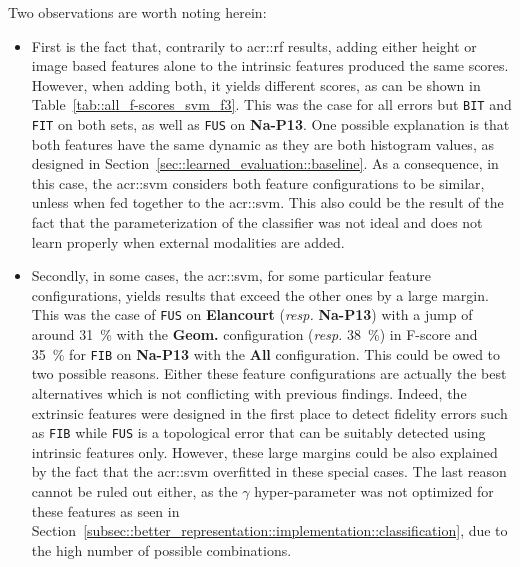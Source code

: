         Two observations are worth noting herein:
        \begin{itemize}[label=\(\blacktriangleright\)]
            \item First is the fact that, contrarily to \gls{acr::rf} results, adding either height or image based features alone to the intrinsic features produced the same scores.
                    However, when adding both, it yields different scores, as can be shown in Table~\ref{tab::all_f-scores_svm_f3}.
                    This was the case for all errors but \texttt{BIT} and \texttt{FIT} on both sets, as well as \texttt{FUS} on \textbf{Na-P13}.
                    One possible explanation is that both features have the same dynamic as they are both histogram values, as designed in Section~\ref{sec::learned_evaluation::baseline}.
                    As a consequence, in this case, the \gls{acr::svm} considers both feature configurations to be similar, unless when fed together to the \gls{acr::svm}.
                    This also could be the result of the fact that the parameterization of the classifier was not ideal and does not learn properly when external modalities are added.
            \item Secondly, in some cases, the \gls{acr::svm}, for some particular feature configurations, yields results that exceed the other ones by a large margin.
                    This was the case of \texttt{FUS} on \textbf{Elancourt} (\textit{resp.} \textbf{Na-P13}) with a jump of around \SI{31}{\percent} with the \textbf{Geom.} configuration (\textit{resp.} \SI{38}{\percent}) in F-score and \SI{35}{\percent} for \texttt{FIB} on \textbf{Na-P13} with the \textbf{All} configuration.
                    This could be owed to two possible reasons.
                    Either these feature configurations are actually the best alternatives which is not conflicting with previous findings.
                    Indeed, the extrinsic features were designed in the first place to detect fidelity errors such as \texttt{FIB} while \texttt{FUS} is a topological error that can be suitably detected using intrinsic features only.
                    However, these large margins could be also explained by the fact that the \gls{acr::svm} overfitted in these special cases.
                    The last reason cannot be ruled out either, as the \(\gamma\) hyper-parameter was not optimized for these features as seen in Section~\ref{subsec::better_representation::implementation::classification}, due to the high number of possible combinations.
            \end{itemize}
            
